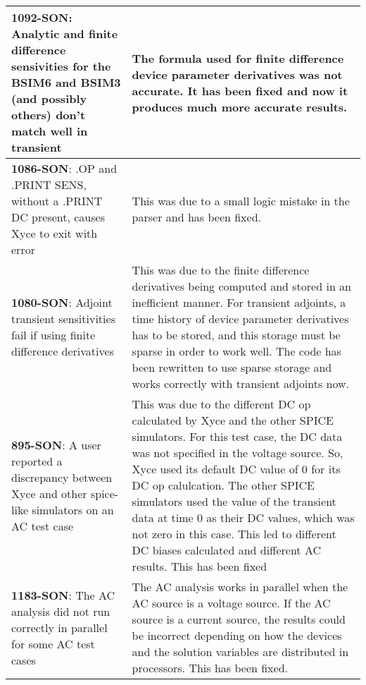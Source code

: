 {\begin{longtable}[h] {>{\raggedright\small}m{2in}|>{\raggedright\let\\\tabularnewline\small}m{3.5in}}
\textbf{1092-SON}: Analytic and finite difference sensivities for the BSIM6 and BSIM3 (and possibly others) don't match well in transient &
The formula used for finite difference device parameter derivatives
was not accurate.  It has been fixed and now it produces much more
accurate results.
\\ \hline

\textbf{1086-SON}: .OP and .PRINT SENS, without a .PRINT DC present, causes Xyce to exit with error  &
This was due to a small logic mistake in the parser and has been
fixed.
\\ \hline

\textbf{1080-SON}: Adjoint transient sensitivities fail if using finite difference derivatives  &
This was due to the finite difference derivatives being computed and
stored in an inefficient manner.  For transient adjoints, a time
history of device parameter derivatives has to be stored, and this
storage must be sparse in order to work well.  The code has been
rewritten to use sparse storage and works correctly with transient
adjoints now.
\\ \hline

\textbf{895-SON}: A user reported a discrepancy between Xyce and other spice-like simulators on an AC test case &
This was due to the different DC op calculated by Xyce and the other
SPICE simulators. For this test case, the DC data was not specified in
the voltage source. So, Xyce used its default DC value of 0 for its DC
op calulcation. The other SPICE simulators used the value of the
transient data at time 0 as their DC values, which was not zero in
this case. This led to different DC biases calculated and different AC
results. This has been fixed
\\ \hline

\textbf{1183-SON}: The AC analysis did not run correctly in parallel for some AC test cases &
The AC analysis works in parallel when the AC source is a voltage
source. If the AC source is a current source, the results could be
incorrect depending on how the devices and the solution variables are
distributed in processors. This has been fixed.
\\ \hline

\end{longtable}
}
